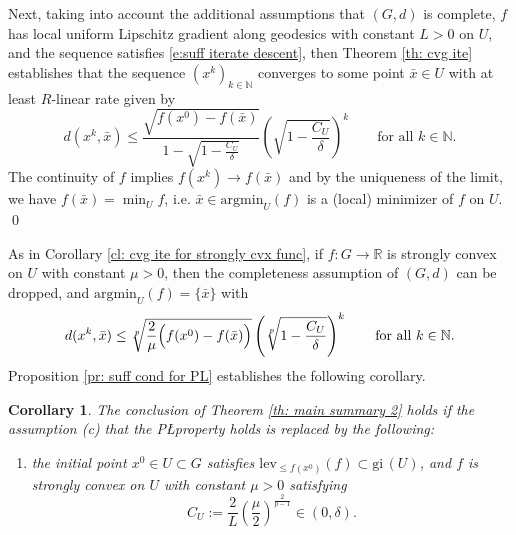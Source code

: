 \documentclass{article}
\theoremstyle{plain}\newtheorem{theorem}{Theorem}[section]
\theoremstyle{plain}\newtheorem{definition}[theorem]{Definition}
\theoremstyle{plain}\newtheorem{lemma}[theorem]{Lemma}
\theoremstyle{definition}\newtheorem{remark}[theorem]{Remark}
\theoremstyle{definition}\newtheorem{example}[theorem]{Example}
\theoremstyle{plain}\newtheorem{proposition}[theorem]{Proposition}
\theoremstyle{plain}\newtheorem{inference}[theorem]{Inference}
\theoremstyle{plain}\newtheorem{corollary}[theorem]{Corollary}
\theoremstyle{plain}\newtheorem{assumption}[theorem]{Assumption}
\newcommand{\xbar}{\bar{x}}
\newcommand{\bbN}{\mathbb{N}}
\newcommand{\Nbb}{\mathbb{N}}
\begin{document}
Next, taking into account the additional assumptions that $(G,d)$ is complete, $f$ has local uniform Lipschitz gradient along geodesics with constant $L>0$ on $U$, and the sequence satisfies \eqref{e:suff iterate descent}, then Theorem \ref{th: cvg ite} establishes that the sequence $(x^k)_{k\in\bbN}$ converges to some point $\bar{x}\in U$ with at least $R$-linear rate given by
$$
d(x^k,\bar{x})\leq\frac{\sqrt{f(x^0)-f(\xbar)}}{1-\sqrt{1-\frac{C_U}{\delta}}}\left(\sqrt{1-\frac{C_U}{\delta}}\right)^{k} \qquad\text{for all}\,\,k\in\Nbb.
$$
The continuity of $f$ implies $f(x^k)\to f(\bar{x})$ and by the uniqueness of the limit, we have $f(\bar{x})=\min_U f$, i.e. $\bar{x}\in\mathrm{argmin}_U(f)$ is a (local) minimizer of $f$ on $U$. \qed

As in Corollary \ref{cl: cvg ite for strongly cvx func}, if $f:G\to\mathbb{R}$ is strongly convex on $U$ with constant $\mu>0$, then the completeness assumption of $(G,d)$ can be dropped, and $\mathrm{argmin}_U(f)=\{\bar{x}\}$ with
$$
d(x^k,\bar{x})\leq\sqrt[p]{\frac{2}{\mu}\Bigl(f(x^0)-f(\xbar)\Bigr)}\left(\sqrt[p]{1-\frac{C_U}{\delta}}\right)^k \qquad\text{for all}\,\,k\in\Nbb.
$$
Proposition \ref{pr: suff cond for PL} establishes the following corollary.
\begin{corollary}
    The conclusion of Theorem \ref{th: main summary 2} holds if the assumption (c) that the P\L  property holds is replaced by the following:
    \begin{enumerate}
        \item[(c')] the initial point $x^0\in U\subset G$ satisfies $\mathrm{lev}_{\leq f(x^0)}(f)\subset\mathrm{gi}\,(U)$, and $f$ is strongly convex on $U$
        with constant $\mu>0$ satisfying
        $$
        C_U:=\frac{2}{L}\left(\frac{\mu}{2}\right)^{\frac{2}{p-1}}\in(0,\delta).
        $$
    \end{enumerate}
\end{corollary}
\end{document}
